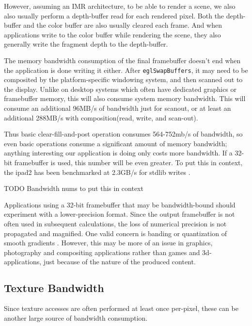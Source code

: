 However, assuming an IMR architecture, to be able to render a scene, we also
also usually perform a depth-buffer read for each rendered pixel.  Both the
depth-buffer and the color buffer are also usually cleared each frame.  And
when applications write to the color buffer while rendering the scene, they
also generally write the fragment depth to the depth-buffer.

The memory bandwidth consumption of the final framebuffer doesn't end when the
application is done writing it either.  After \texttt{eglSwapBuffers}, it may
need to be composited by the platform-specific windowing system, and then
scanned out to the display.  Unlike on desktop systems which often have
dedicated graphics or framebuffer memory, this will also consume system memory
bandwidth.  This will consume an additional 96MB/s of bandwidth just for
scanout, or at least an additional 288MB/s with composition(read, write, and
scan-out).


Thus basic clear-fill-and-post operation consumes 564-752mb/s of bandwidth, so
even basic operations consume a significant amount of memory bandwidth;
anything interesting our application is doing only costs more bandwidth.  If a
32-bit framebuffer is used, this number will be even greater.  To put this in
context, the ipad2 has been benchmarked at 2.3GB/s for stdlib writes
\cite{anandtech_ipad2}.  

TODO Bandwidth nums to put this in context


Applications using a 32-bit framebuffer that may be bandwidth-bound should
experiment with a lower-precision format.  Since the output framebuffer is not
often used in subsequent calculations, the loss of numerical precision is not
propagated and magnified.  One valid concern is banding or quantization of
smooth gradients \cite{32_bit_windows}.  However, this may be more of an issue
in graphics, photography and compositing applications rather than games and
3d-applications, just because of the nature of the produced content.

\subsection{Texture Bandwidth}\label{JonMcCaffrey-Texture-Bandwidth} Since
texture accesses are often performed at least once per-pixel, these can be
another large source of bandwidth consumption.

